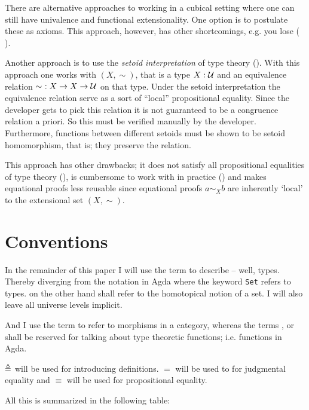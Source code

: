 There are alternative approaches to working in a cubical setting where
one can still have univalence and functional extensionality. One
option is to postulate these as axioms. This approach, however, has
other shortcomings, e.g. you lose 
( \cite{huber-2016}).

Another approach is to use the \emph{setoid interpretation} of type
theory (\cite{hofmann-1995,huber-2016}). With this approach one works
with  $(X, \sim)$, that is a type $X \mathrel{:}
\mathcal{U}$ and an equivalence relation $\sim\ \mathrel{:} X \to X \to \mathcal{U}$ on that
type. Under the setoid interpretation the equivalence relation serve
as a sort of ``local'' propositional equality. Since the developer
gets to pick this relation it is not guaranteed to be a congruence
relation a priori. So this must be verified manually by the developer.
Furthermore, functions between different setoids must be shown to be
setoid homomorphism, that is; they preserve the relation.

This approach has other drawbacks; it does not satisfy
all propositional equalities of type theory (), is
cumbersome to work with in practice (\cite[p. 4]{huber-2016}) and makes
equational proofs less reusable since equational proofs $a \sim_{X} b$ are
inherently `local' to the extensional set $(X , \sim)$.

\section{Conventions}

In the remainder of this paper I will use the term
 to describe --
well, types. Thereby diverging from the notation in Agda where the keyword
\texttt{Set} refers to types.
 on the other hand shall refer to the
homotopical notion of a set. I will also leave all universe levels implicit.

And I use the term
 to refer to morphisms in a category,
whereas the terms
,
 or
shall be reserved for talking about type theoretic functions; i.e.
functions in Agda.

$\mathrel{\triangleq}$ will be used for introducing definitions. $=$ will be used to for
judgmental equality and $\equiv$ will be used for propositional equality.

All this is summarized in the following table:

